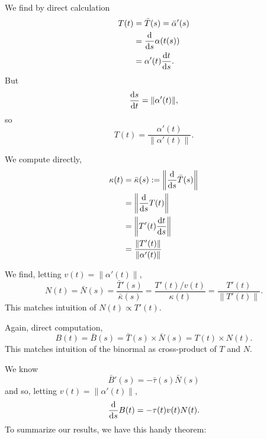 We find by direct calculation
\begin{subequations}
  \begin{align}
    T(t) &= \bar{T}(s) = \bar{\alpha}'(s)\\
    &= \frac{\mathrm{d}}{\mathrm{d} s}\alpha(t(s))\\
    &= \alpha'(t)\frac{\mathrm{d} t}{\mathrm{d} s}.
  \end{align}
\end{subequations}
But
\begin{equation}
\frac{\mathrm{d} s}{\mathrm{d} t}=\|\alpha'(t)\|,
\end{equation}
so
\begin{equation}
T(t) = \frac{\alpha'(t)}{\|\alpha'(t)\|}.
\end{equation}

We compute directly,
\begin{subequations}
  \begin{align}
    \kappa(t) &=\bar{\kappa}(s) :=\left\|\frac{\mathrm{d}}{\mathrm{d} s}\bar{T}(s)\right\|\\
    &=\left\|\frac{\mathrm{d}}{\mathrm{d} s}T(t)\right\|\\
    &=\left\|T'(t)\frac{\mathrm{d} t}{\mathrm{d} s}\right\|\\
    &=\frac{\|T'(t)\|}{\|\alpha'(t)\|}
  \end{align}
\end{subequations}

We find, letting $v(t)=\|\alpha'(t)\|$,
\begin{equation}
N(t) = \bar{N}(s) = \frac{\bar{T}'(s)}{\bar{\kappa}(s)} = \frac{T'(t)/v(t)}{\kappa(t)}
=\frac{T'(t)}{\|T'(t)\|}.
\end{equation}
This matches intuition of $N(t)\propto T'(t)$.

Again, direct computation,
\begin{equation}
B(t) = \bar{B}(s) = \bar{T}(s)\times\bar{N}(s) = T(t)\times N(t).
\end{equation}
This matches intuition of the binormal as cross-product of $T$ and $N$.

We know
\begin{equation}
\bar{B}'(s) = -\bar{\tau}(s)\bar{N}(s)
\end{equation}
and so, letting $v(t)=\|\alpha'(t)\|$,
\begin{equation}
\frac{\mathrm{d}}{\mathrm{d} s}B(t) = -\tau(t)v(t)N(t).
\end{equation}
To summarize our results, we have this handy theorem:

